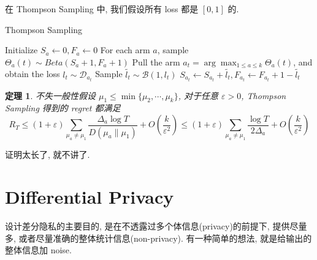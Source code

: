 \documentclass[8pt]{article}
\theoremstyle{compact}
\newtheorem{theorem}{定理}[section]
\def\le{\leqslant}
\begin{document}
在 Thompson Sampling 中, 我们假设所有 loss 都是 $[0, 1]$ 的.

\begin{algorithm}
	\caption{Thompson Sampling}
	\begin{algorithmic}[1]
		\State Initialize $S_a \gets 0, F_a \gets 0$
			\State For each arm $a$, sample $\Theta_a(t) \sim Beta(S_a + 1, F_a + 1)$
			\State Pull the arm $a_t = \arg \max_{1 \le a \le k}\Theta_a(t)$, and obtain the loss $l_t \sim \mathcal D_{a_t}$ 
			\State Sample $\tilde{l_t} \sim \mathcal B(1, l_t)$ 
			\State $S_{a_t} \gets S_{a_t} + \tilde{l_t}, F_{a_t} \gets F_{a_t} + 1 - \tilde{l_t}$
		\EndFor
	\end{algorithmic}
\end{algorithm}
\begin{theorem}
	不失一般性假设 $\mu_1 \le \min\{\mu_2, \cdots, \mu_k\}$, 对于任意 $\varepsilon > 0$, Thompson Sampling 得到的 regret 都满足 $$R_T \le (1 + \varepsilon)\sum_{\mu_a \neq \mu_1}\frac{\Delta_a\log T}{D(\mu_a \| \mu_1)} + O\left(\frac{k}{\varepsilon^2}\right) \le (1 + \varepsilon)\sum_{\mu_a \neq \mu_1}\frac{\log T}{2\Delta_a} + O\left(\frac{k}{\varepsilon^2}\right)$$
\end{theorem}

证明太长了, 就不讲了.

\section{Differential Privacy}

设计差分隐私的主要目的, 是在不透露过多个体信息(privacy)的前提下, 提供尽量多, 或者尽量准确的整体统计信息(non-privacy). 有一种简单的想法, 就是给输出的整体信息加 noise.
\end{document}
